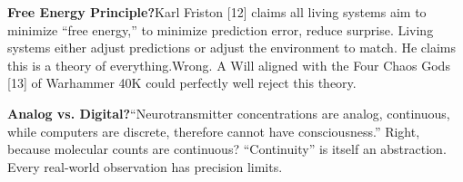 \documentclass[11pt]{article}
\renewcommand{\\}[1][\mynewlineskip]{\oldnewline[#1]}
\begin{document}
\vspace{1em}
\textbf{Free Energy Principle?}\\
Karl Friston [12] claims all living systems aim to minimize ``free energy,'' to minimize prediction error, reduce surprise. Living systems either adjust predictions or adjust the environment to match. He claims this is a theory of everything.\\
Wrong. A Will aligned with the Four Chaos Gods [13] of Warhammer 40K could perfectly well reject this theory.

\vspace{1em}
\textbf{Analog vs. Digital?}\\
``Neurotransmitter concentrations are analog, continuous, while computers are discrete, therefore cannot have consciousness.'' Right, because molecular counts are continuous? ``Continuity'' is itself an abstraction. Every real-world observation has precision limits.
\end{document}
